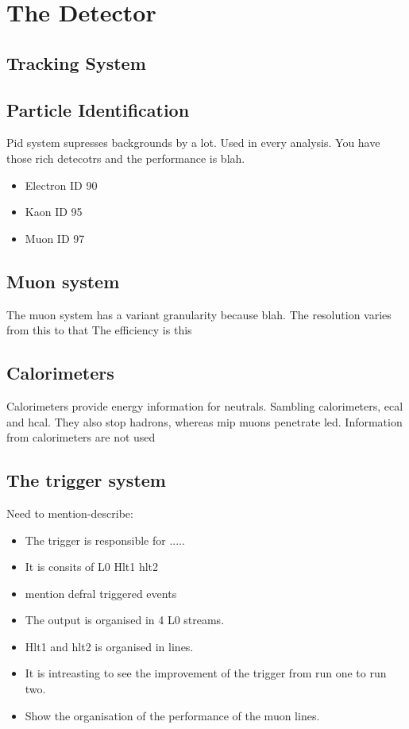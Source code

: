 
\chapter{The \lhcb Detector}
\label{lhcb_detector}



\section{Tracking System}
\label{det_tracking}



\section{Particle Identification}
Pid system supresses backgrounds by a lot.
Used in every analysis.
You have those rich detecotrs and the performance is blah.

\begin{itemize}
  \item Electron ID  90 %
  \item Kaon ID 95 %
  \item Muon ID 97 %
\end{itemize}

\section{Muon system}
The muon system has a variant granularity because blah.
The resolution varies from this to that
The efficiency is this

\section{Calorimeters}
\label{det_calo}
Calorimeters provide energy information for neutrals.
Sambling calorimeters, ecal and hcal.
They also stop hadrons, whereas mip muons penetrate led.
Information from calorimeters are not used

\section{The trigger system}
\label{det_trigger}

Need to mention-describe:
\begin{itemize}
  \item The trigger is responsible for .....
  \item It is consits of L0 Hlt1 hlt2
  \item mention defral triggered events
  \item The output is organised in 4 L0 streams.
  \item Hlt1 and hlt2 is organised in lines.
  \item It is intreasting to see the improvement of the trigger from run one to run two.
  \item Show the organisation of the performance of the muon lines.
\end{itemize}


